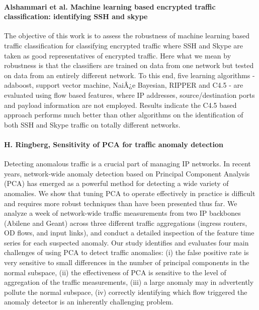 \paragraph*{Alshammari et al. Machine learning based encrypted traffic classification: identifying SSH and skype}
\cite{alshammari2009machine}
The objective of this work is to assess the robustness of machine learning based traffic classification for classifying encrypted traffic where SSH and Skype are taken as good representatives of encrypted traffic. Here what we mean by robustness is that the classifiers are trained on data from one network but tested on data from an entirely different network. To this end, five learning algorithms - adaboost, support vector machine, NaiÂ¿e Bayesian, RIPPER and C4.5 - are evaluated using flow based features, where IP addresses, source/destination ports and payload information are not employed. Results indicate the C4.5 based approach performs much better than other algorithms on the identification of both SSH and Skype traffic on totally different networks.

\paragraph*{H. Ringberg, 
Sensitivity of PCA for traffic anomaly detection}
\cite{ringberg2007sensitivity}
Detecting anomalous traffic is a crucial part of managing IP networks. In recent years, network-wide anomaly detection based on Principal Component Analysis (PCA) has emerged as a powerful method for detecting a wide variety of anomalies. We show that tuning PCA to operate effectively in practice is difficult and requires more robust techniques than have been presented thus far. We analyze a week of network-wide traffic measurements from two IP backbones (Abilene and Geant) across three different traffic aggregations (ingress routers, OD flows, and input links), and conduct a detailed inspection of the feature time series for each suspected anomaly. Our study identifies and evaluates four main challenges of using PCA to detect traffic anomalies: (i) the false positive rate is very sensitive to small differences in the number of principal components in the normal subspace, (ii) the effectiveness of PCA is sensitive to the level of aggregation of the traffic measurements, (iii) a large anomaly may in advertently pollute the normal subspace, (iv) correctly identifying which flow triggered the anomaly detector is an inherently challenging problem.

